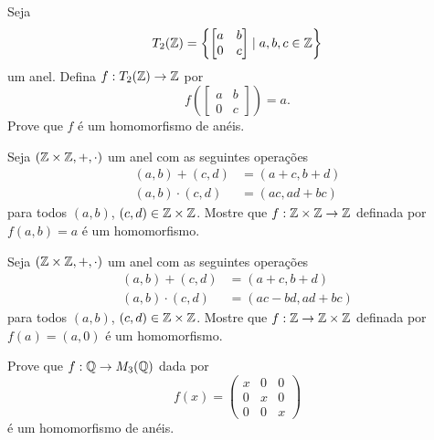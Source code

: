 \documentclass[12pt]{exam}
\begin{document}
    \questao{} Seja
    \[
        T_2(\mathbb{Z}) = \left\{\begin{bmatrix}a & b\\ 0 & c\end{bmatrix} \mid a, b, c \in \mathbb{Z}\right\}
    \]
    um anel. Defina $f : T_2(\mathbb{Z}) \to \mathbb{Z}$ por
    \[
        f\left(\begin{bmatrix}a & b\\ 0 & c\end{bmatrix}\right) = a.
    \]
    Prove que $f$ é um homomorfismo de anéis.

    \vspace{.3cm}

    \questao{} Seja $(\mathbb{Z}\times\mathbb{Z}, +, \cdot)$ um anel com as seguintes opera\c{c}\~oes
    \begin{align*}
        (a, b) + (c, d) &= (a + c, b + d)\\
        (a, b)\cdot (c, d) &= (ac, ad + bc)
    \end{align*}
    para todos $(a, b)$, $(c, d) \in \mathbb{Z}\times\mathbb{Z}$.
    Mostre que $ f : \mathbb{Z}\times\mathbb{Z} \to \mathbb{Z}$ definada por $f(a, b) = a$ \'e um homomorfismo.

    \vspace{.3cm}

    \questao{} Seja $(\mathbb{Z}\times\mathbb{Z}, +, \cdot)$ um anel com as seguintes opera\c{c}\~oes
    \begin{align*}
        (a, b) + (c, d) &= (a + c, b + d)\\
        (a, b)\cdot (c, d) &= (ac - bd, ad + bc)
    \end{align*}
    para todos $(a, b)$, $(c, d) \in \mathbb{Z}\times\mathbb{Z}$.
    Mostre que $ f : \mathbb{Z} \to \mathbb{Z}\times\mathbb{Z}$ definada por $f(a) = (a, 0)$ \'e um homomorfismo.

    \vspace{.3cm}

    \questao{} Prove que $f : \mathbb{Q} \to M_3(\mathbb{Q})$ dada por
    \[
        f(x) = \begin{pmatrix}
            x & 0 & 0\\
            0 & x & 0\\
            0 & 0 & x
        \end{pmatrix}
    \]
    \'e um homomorfismo de an\'eis.

    \newpage
\end{document}
